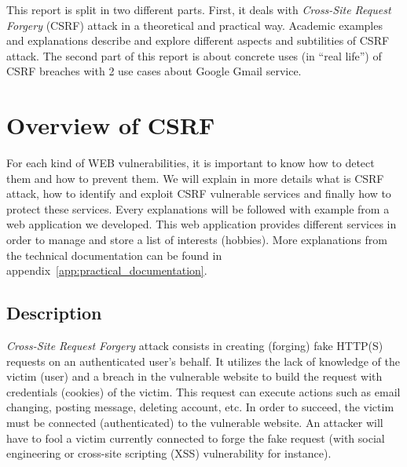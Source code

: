 \documentclass[a4paper,11pt,openany]{report}
\newcommand{\csrf}{\textit{Cross-Site Request Forgery}}
\begin{document}
  This report is split in two different parts. First, it deals with \csrf{} (CSRF) attack in 
  a theoretical and practical way. Academic examples and explanations describe and explore 
  different aspects and subtilities of CSRF attack. The second part of this report is about concrete 
  uses (in ``real life'') of CSRF breaches with 2 use cases about Google Gmail service.

  \section{Overview of CSRF}
  
  For each kind of WEB vulnerabilities, it is important to know how to detect them and 
  how to prevent them. We will explain in more details what is CSRF attack, how to 
  identify and exploit CSRF vulnerable services and finally how to protect these services. 
  Every explanations will be followed with example from a web application we developed. 
  This web application provides different services in order to manage and store a list of 
  interests (hobbies). More explanations from the technical documentation can be found 
  in appendix~\ref{app:practical_documentation}.
  
  \subsection{Description}
  \csrf{} attack consists in creating (forging) fake HTTP(S) requests on an authenticated 
  user's behalf. It utilizes the lack of knowledge of the victim (user) and a breach in 
  the vulnerable website to build the request with credentials (cookies) of the victim. This 
  request can execute actions such as email changing, posting message, deleting account, etc.
  In order to succeed, the victim must be connected (authenticated) to the vulnerable website. 
  An attacker will have to fool a victim currently connected to forge the fake request (with 
  social engineering or cross-site scripting (XSS)\cite{wikipedia_xss} vulnerability for 
  instance).
  
\end{document}
